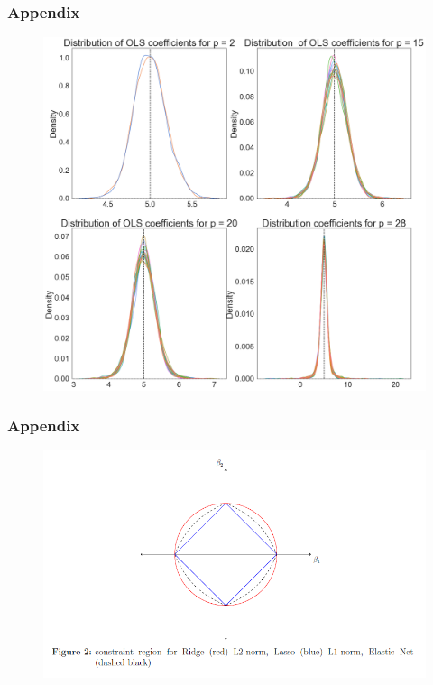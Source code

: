 \begin{frame}[fragile]
\frametitle{Appendix}
    \begin{figure}[b]
        \includegraphics[scale=0.17]{Img/ols_distr.png}
        \centering
    \end{figure}
\end{frame}
\begin{frame}[fragile]
    \frametitle{Appendix}
    \begin{figure}[c]
        \includegraphics[scale=0.57]{Img/constraints.png}\hspace{-1.2cm}
        \centering
    \end{figure}
\end{frame}
